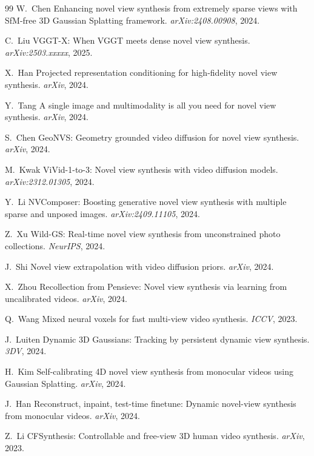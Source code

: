 \begin{thebibliography}{99}
W.~Chen \etal
Enhancing novel view synthesis from extremely sparse views with SfM-free
3D Gaussian Splatting framework.
\emph{arXiv:2408.00908}, 2024.


C.~Liu \etal
VGGT-X: When VGGT meets dense novel view synthesis.
\emph{arXiv:2503.xxxxx}, 2025.


X.~Han \etal
Projected representation conditioning for high-fidelity novel view synthesis.
\emph{arXiv}, 2024.


Y.~Tang \etal
A single image and multimodality is all you need for novel view synthesis.
\emph{arXiv}, 2024.


S.~Chen \etal
GeoNVS: Geometry grounded video diffusion for novel view synthesis.
\emph{arXiv}, 2024.


M.~Kwak \etal
ViVid-1-to-3: Novel view synthesis with video diffusion models.
\emph{arXiv:2312.01305}, 2024.


Y.~Li \etal
NVComposer: Boosting generative novel view synthesis with multiple sparse
and unposed images.
\emph{arXiv:2409.11105}, 2024.


Z.~Xu \etal
Wild-GS: Real-time novel view synthesis from unconstrained photo collections.
\emph{NeurIPS}, 2024.


J.~Shi \etal
Novel view extrapolation with video diffusion priors.
\emph{arXiv}, 2024.


X.~Zhou \etal
Recollection from Pensieve: Novel view synthesis via learning from uncalibrated
videos.
\emph{arXiv}, 2024.


Q.~Wang \etal
Mixed neural voxels for fast multi-view video synthesis.
\emph{ICCV}, 2023.


J.~Luiten \etal
Dynamic 3D Gaussians: Tracking by persistent dynamic view synthesis.
\emph{3DV}, 2024.


H.~Kim \etal
Self-calibrating 4D novel view synthesis from monocular videos using Gaussian
Splatting.
\emph{arXiv}, 2024.


J.~Han \etal
Reconstruct, inpaint, test-time finetune: Dynamic novel-view synthesis from
monocular videos.
\emph{arXiv}, 2024.


Z.~Li \etal
CFSynthesis: Controllable and free-view 3D human video synthesis.
\emph{arXiv}, 2023.



\end{thebibliography}

